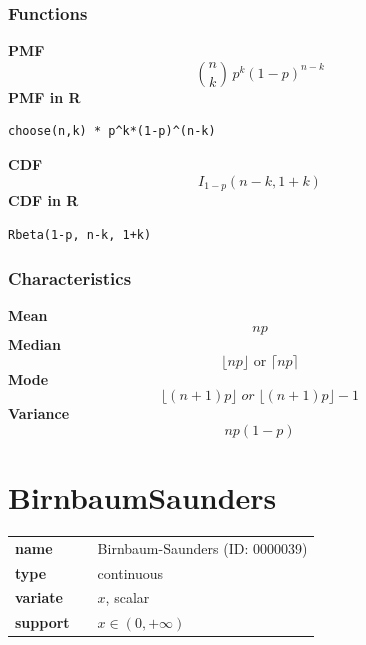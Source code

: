 \subsubsection*{Functions}

\smallskip \noindent \hspace{.2cm} \textbf{PMF} 
\begin{equation*}{n \choose k}\, p^k (1-p)^{n-k}\end{equation*}
\smallskip \noindent \hspace{.2cm} \textbf{PMF in R}  
\begin{verbatim}choose(n,k) * p^k*(1-p)^(n-k)\end{verbatim}
\smallskip \noindent \hspace{.2cm} \textbf{CDF} 
\begin{equation*}I_{1-p}(n - k, 1 + k)\end{equation*}
\smallskip \noindent \hspace{.2cm} \textbf{CDF in R} 
\begin{verbatim}Rbeta(1-p, n-k, 1+k)\end{verbatim}
\smallskip
\subsubsection*{Characteristics}
\smallskip \noindent \hspace{.2cm} \textbf{Mean} 
\begin{equation*}np\end{equation*}
\smallskip \noindent \hspace{.2cm} \textbf{Median} 
\begin{equation*}\lfloor np \rfloor \text{ or } \lceil np \rceil\end{equation*}
\smallskip \noindent \hspace{.2cm} \textbf{Mode} 
\begin{equation*}\lfloor (n + 1)p \rfloor \; or \; \lfloor (n + 1)p \rfloor - 1\end{equation*}
\smallskip \noindent \hspace{.2cm} \textbf{Variance} 
\begin{equation*}np(1 - p)\end{equation*}
\smallskip
\section*{BirnbaumSaunders} 

  \bigskip 

\begin{tabular}{p{2cm}cl}
\textbf{name} & & Birnbaum-Saunders (ID: 0000039)\\ 
 
\textbf{type} & & continuous \\ 

\textbf{variate} & & $x$, scalar \\ 

\textbf{support} & & $x \in (0,+\infty)$
\end{tabular}

